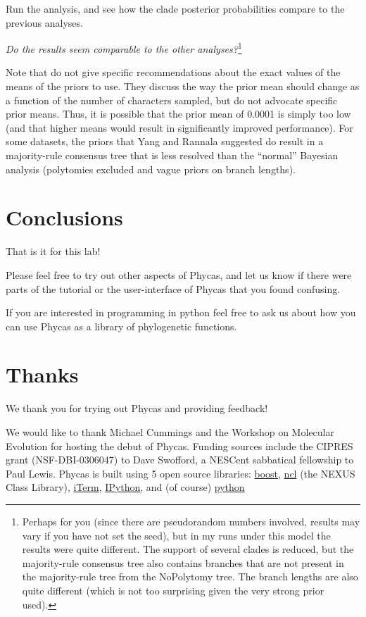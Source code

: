 \documentclass{article}
\newcommand{\phycas}{Phycas\xspace}
\newcommand{\QandA}[2]{\textit{#1}\footnote{#2}\xspace}
\begin{document}
Run the analysis, and see how the clade posterior probabilities compare to the previous analyses.

\QandA{Do the results seem comparable to the other analyses?}{Perhaps for you (since there are pseudorandom numbers involved, results may vary if you have not set the seed), but in my runs under this model the results were quite different.
The support of several clades is reduced, but the majority-rule consensus tree also contains 
branches that are not present in the majority-rule tree from the NoPolytomy tree.
The branch lengths are also quite different (which is not too surprising given the very strong prior 
used).}

Note that \citet{YangR2005} do not give specific recommendations about the exact values of the means of  the priors to use.
They discuss the way the prior mean should change as a function of the number of characters sampled, but
do not advocate specific prior means.
Thus, it is possible that the prior mean of 0.0001 is simply too low (and that higher means would result in significantly improved performance).
For some datasets, the priors that Yang and Rannala suggested do result in a majority-rule consensus tree that is less resolved than the ``normal'' Bayesian analysis (polytomies excluded and vague priors on 
branch lengths).

\section{Conclusions}
That is it for this lab! 

Please feel free to try out other aspects of \phycas, and let us know if there were
parts of the tutorial or the user-interface of \phycas that
you found confusing.

If you are interested in programming in python
feel free to ask us about how you can use
\phycas as a library of phylogenetic functions.

\section{Thanks}
We thank you for trying out \phycas and providing feedback!

We would like to thank Michael Cummings and the Workshop on Molecular Evolution for hosting the debut of \phycas. Funding sources include the CIPRES grant (NSF-DBI-0306047) to Dave Swofford, a NESCent sabbatical fellowship to Paul Lewis. 
\phycas is built using 5 open source libraries: \href{http://www.boost.org/}{boost}, \href{http://sourceforge.net/projects/ncl/}{ncl} (the NEXUS Class Library),  \href{http://iterm.sourceforge.net/}{iTerm},  \href{http://ipython.scipy.org/moin/}{IPython}, and (of course) \href{http://www.python.org/}{python}
\end{document}
